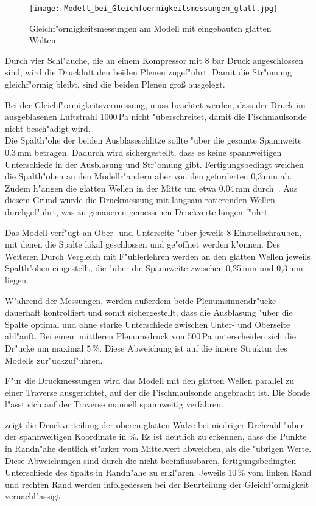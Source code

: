 \begin{figure}[h]
	\centering
	\texttt{[image: Modell\_bei\_Gleichfoermigkeitsmessungen\_glatt.jpg]}
	\caption{Gleichf"ormigkeitsmessungen am Modell mit eingebauten glatten Walten}
	\label{fig:Modell_bei_Gleichf"ormigkeitsmessungen}
\end{figure}

Durch vier Schl"auche, die an einem Kompressor mit 8 bar Druck angeschlossen sind, wird die Druckluft den beiden Plenen zugef"uhrt. Damit die Str"omung gleichf"ormig bleibt, sind die beiden Plenen gro\ss{} ausgelegt. 

Bei der Gleichf"ormigkeitsvermessung, muss beachtet werden, dass der Druck im ausgeblasenen Luftstrahl 1000\,Pa nicht "uberschreitet, damit die Fischmaulsonde nicht besch"adigt wird.\\
Die Spalth"ohe der beiden Ausblaseschlitze sollte "uber die gesamte Spannweite 0.3\,mm betragen. Dadurch wird sichergestellt, dass es keine spannweitigen Unterschiede in der Ausblasung und Str"omung gibt.
Fertigungsbedingt weichen die Spalth"ohen an den Modellr"andern aber von den geforderten 0,3\,mm ab. Zudem h"angen die glatten Wellen in der Mitte um etwa 0,04\,mm durch~\cite{Bilges.2018}. Aus diesem Grund wurde die Druckmessung mit langsam rotierenden Wellen durchgef"uhrt, was zu genaueren gemessenen Druckverteilungen f"uhrt.

Das Modell verf"ugt an Ober- und Unterseite "uber jeweils 8 Einstellschrauben, mit denen die Spalte lokal geschlossen und ge"offnet werden k"onnen. Des Weiteren 
Durch Vergleich mit F"uhlerlehren werden an den glatten Wellen jeweils Spalth"ohen eingestellt, die "uber die Spannweite zwischen 0,25\,mm und 0,3\,mm liegen.

W"ahrend der Messungen, werden au\ss{}erdem beide Plenumsinnendr"ucke dauerhaft kontrolliert und somit sichergestellt, dass die Ausblasung "uber die Spalte optimal und ohne starke Unterschiede zwischen Unter- und Oberseite abl"auft.
Bei einem mittleren Plenumsdruck von 500\,Pa unterscheiden sich die Dr"ucke um maximal 5\,\%. Diese Abweichung ist auf die innere Struktur des Modells zur"uckzuf"uhren.

F"ur die Druckmessungen wird das Modell mit den glatten Wellen parallel zu einer Traverse ausgerichtet, auf der die Fischmaulsonde angebracht ist. Die Sonde l"asst sich auf der Traverse manuell spannweitig verfahren. 

 zeigt die Druckverteilung der oberen glatten Walze bei niedriger Drehzahl "uber der spannweitigen Koordinate in \%. Es ist deutlich zu erkennen, dass die Punkte in Randn"ahe deutlich st"arker vom Mittelwert abweichen, als die "ubrigen Werte. Diese Abweichungen sind durch die nicht beeinflussbaren, fertigungsbedingten Unterschiede des Spalts in Randn"ahe zu erkl"aren.
Jeweils 10\,\% vom linken Rand und rechten Rand werden infolgedessen bei der Beurteilung der Gleichf"ormigkeit vernachl"assigt.

